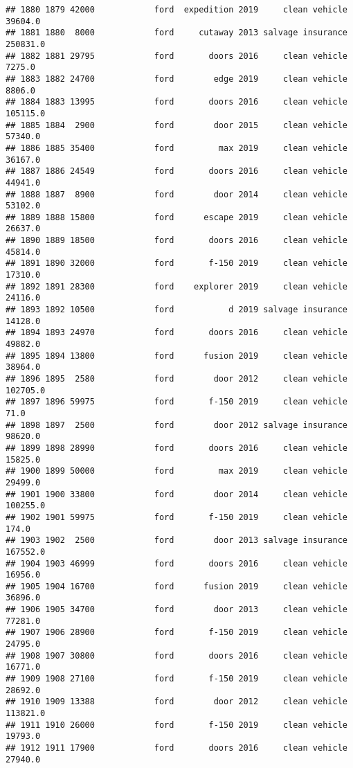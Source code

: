 \documentclass[
]{article}
\begin{document}
\begin{verbatim}
## 1880 1879 42000            ford  expedition 2019     clean vehicle   39604.0
## 1881 1880  8000            ford     cutaway 2013 salvage insurance  250831.0
## 1882 1881 29795            ford       doors 2016     clean vehicle    7275.0
## 1883 1882 24700            ford        edge 2019     clean vehicle    8806.0
## 1884 1883 13995            ford       doors 2016     clean vehicle  105115.0
## 1885 1884  2900            ford        door 2015     clean vehicle   57340.0
## 1886 1885 35400            ford         max 2019     clean vehicle   36167.0
## 1887 1886 24549            ford       doors 2016     clean vehicle   44941.0
## 1888 1887  8900            ford        door 2014     clean vehicle   53102.0
## 1889 1888 15800            ford      escape 2019     clean vehicle   26637.0
## 1890 1889 18500            ford       doors 2016     clean vehicle   45814.0
## 1891 1890 32000            ford       f-150 2019     clean vehicle   17310.0
## 1892 1891 28300            ford    explorer 2019     clean vehicle   24116.0
## 1893 1892 10500            ford           d 2019 salvage insurance   14128.0
## 1894 1893 24970            ford       doors 2016     clean vehicle   49882.0
## 1895 1894 13800            ford      fusion 2019     clean vehicle   38964.0
## 1896 1895  2580            ford        door 2012     clean vehicle  102705.0
## 1897 1896 59975            ford       f-150 2019     clean vehicle      71.0
## 1898 1897  2500            ford        door 2012 salvage insurance   98620.0
## 1899 1898 28990            ford       doors 2016     clean vehicle   15825.0
## 1900 1899 50000            ford         max 2019     clean vehicle   29499.0
## 1901 1900 33800            ford        door 2014     clean vehicle  100255.0
## 1902 1901 59975            ford       f-150 2019     clean vehicle     174.0
## 1903 1902  2500            ford        door 2013 salvage insurance  167552.0
## 1904 1903 46999            ford       doors 2016     clean vehicle   16956.0
## 1905 1904 16700            ford      fusion 2019     clean vehicle   36896.0
## 1906 1905 34700            ford        door 2013     clean vehicle   77281.0
## 1907 1906 28900            ford       f-150 2019     clean vehicle   24795.0
## 1908 1907 30800            ford       doors 2016     clean vehicle   16771.0
## 1909 1908 27100            ford       f-150 2019     clean vehicle   28692.0
## 1910 1909 13388            ford        door 2012     clean vehicle  113821.0
## 1911 1910 26000            ford       f-150 2019     clean vehicle   19793.0
## 1912 1911 17900            ford       doors 2016     clean vehicle   27940.0

\end{verbatim}
\end{document}
